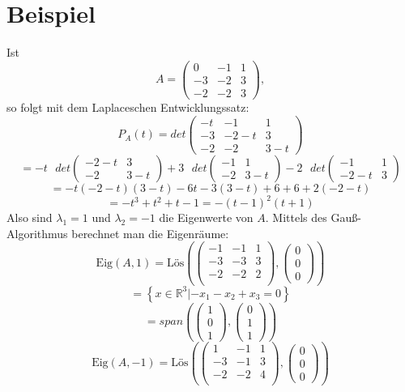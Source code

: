 \documentclass{scrbook}
\begin{document}
\section{Beispiel}
Ist
\[A=\left(
\begin{array}{ccc}
0&-1&1\\
-3&-2&3\\
-2&-2&3
\end{array}
\right),\]
so folgt mit dem Laplaceschen Entwicklungssatz:
\[P_A(t)=det\left(
\begin{array}{ccc}
-t&-1&1\\
-3&-2-t&3\\
-2&-2&3-t
\end{array}
\right) \]\[= -t\text{ } det\left(
\begin{array}{cc}
-2-t&3\\
-2&3-t
\end{array}
\right)+3\text{ }det\left(
\begin{array}{cc}
-1&1\\
-2&3-t
\end{array}
\right)-2\text{ }det\left(
\begin{array}{cc}
-1&1\\
-2-t&3
\end{array}
\right)\]
\[=-t(-2-t)(3-t)-6t-3(3-t)+6+6+2(-2-t)\]
\[=-t^3+t^2+t-1=-(t-1)^2(t+1)\]
Also sind $\lambda_1=1$ und $\lambda_2=-1$ die Eigenwerte von $A$. Mittels des Gauß-Algorithmus berechnet man die Eigenräume:
\[\text{Eig}(A,1) = \text{Lös}\left(
\left(\begin{array}{ccc}
-1&-1&1\\
-3&-3&3\\
-2&-2&2\\
\end{array}
\right),
\left(
\begin{array}{c}
0\\0\\0
\end{array}
\right)
\right)\]
\[
=\left\{x\in \mathbb{R}^3|-x_1-x_2+x_3=0\right\}
\]
\[
=span\left(
\left(
\begin{array}{c}
1\\0\\1
\end{array}
\right),\left(
\begin{array}{c}
0\\1\\1
\end{array}
\right)
\right)\]
\[\text{Eig}(A,-1) = \text{Lös}\left(
\left(\begin{array}{ccc}
1&-1&1\\
-3&-1&3\\
-2&-2&4\\
\end{array}
\right),
\left(
\begin{array}{c}
0\\0\\0
\end{array}
\right)
\right)\]
\end{document}
